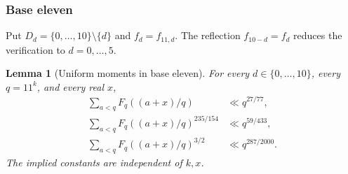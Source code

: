 \documentclass[11pt,a4paper]{article}
\theoremstyle{paperplain}
\newtheorem{lemma}[theorem]{Lemma}
\numberwithin{equation}{section}
\begin{document}
\subsubsection{Base eleven}

Put $D_d=\{0,\ldots,10\}\setminus\{d\}$ and $f_d=f_{11,d}$.
The reflection
$f_{10-d}=f_d$ reduces the verification to $d=0,\ldots,5$.

\begin{lemma}[Uniform moments in base eleven]\label{eleven:moments}
For every $d\in\{0,\ldots,10\}$, every $q=11^k$, and every real $x$,
\begin{align}
 \sum_{a<q}F_q((a+x)/q)&\ll q^{27/77},\label{eleven:l1}\\
 \sum_{a<q}F_q((a+x)/q)^{235/154}&\ll q^{59/433},\label{eleven:oldmoment}\\
 \sum_{a<q}F_q((a+x)/q)^{3/2}&\ll q^{287/2000}.\label{eleven:newmoment}
\end{align}
The implied constants are independent of $k,x$.
\end{lemma}
\end{document}
